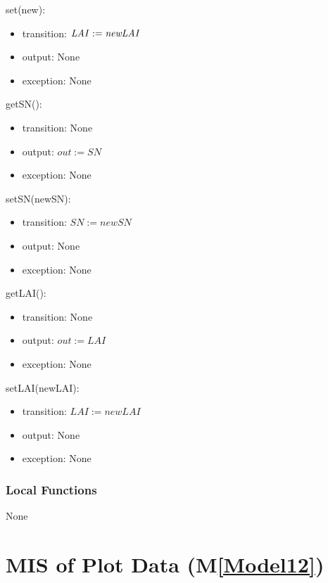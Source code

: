 \documentclass[12pt, titlepage]{article}
\newcommand{\mref}[1]{M\ref{#1}}
\begin{document}
\noindent set\attr(new\attr):
\begin{itemize}
\item transition: $\mathit{\attr := new\attr}$
\item output: None
\item exception: None
\end{itemize}

\renewcommand{\attr}{SN}
\noindent get\attr():
\begin{itemize}
\item transition: None
\item output: $\mathit{out := \attr}$
\item exception: None
\end{itemize}

\noindent set\attr(new\attr):
\begin{itemize}
\item transition: $\mathit{\attr := new\attr}$
\item output: None
\item exception: None
\end{itemize}

\renewcommand{\attr}{LAI}
\noindent get\attr():
\begin{itemize}
\item transition: None
\item output: $\mathit{out := \attr}$
\item exception: None
\end{itemize}

\noindent set\attr(new\attr):
\begin{itemize}
\item transition: $\mathit{\attr := new\attr}$
\item output: None
\item exception: None
\end{itemize}

\subsubsection{Local Functions}
None

\newpage

\section{MIS of Plot Data (\mref{Model12})}
\end{document}
